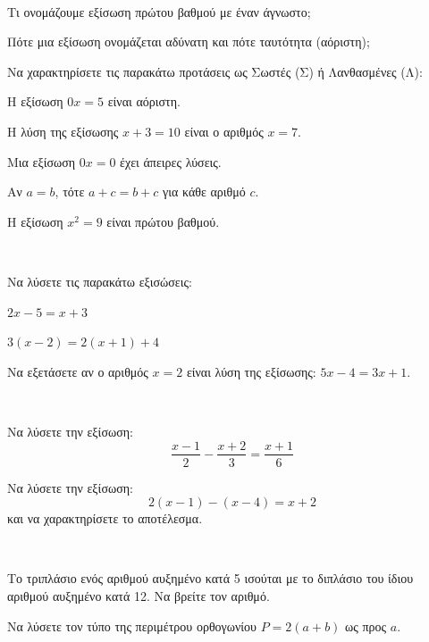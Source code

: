 \documentclass[11pt,a4paper,modern,F]{FFExam}
\begin{document}

\begin{thema}
\item\mbox{}\\
\begin{erwthma}
    \item Τι ονομάζουμε εξίσωση πρώτου βαθμού με έναν άγνωστο; 
    \item Πότε μια εξίσωση ονομάζεται αδύνατη και πότε ταυτότητα (αόριστη); 
    \item Να χαρακτηρίσετε τις παρακάτω προτάσεις ως Σωστές (Σ) ή Λανθασμένες (Λ):
    \begin{alist}
        \item Η εξίσωση $0x = 5$ είναι αόριστη.
        \item Η λύση της εξίσωσης $x + 3 = 10$ είναι ο αριθμός $x = 7$.
        \item Μια εξίσωση $0x = 0$ έχει άπειρες λύσεις.
        \item Αν $a = b$, τότε $a + c = b + c$ για κάθε αριθμό $c$.
        \item Η εξίσωση $x^2 = 9$ είναι πρώτου βαθμού.
    \end{alist} 
\end{erwthma}

\item\mbox{}\\
\begin{erwthma}
    \item Να λύσετε τις παρακάτω εξισώσεις:
    \begin{alist}
        \item $2x - 5 = x + 3$
        \item $3(x - 2) = 2(x + 1) + 4$
    \end{alist} 
    \item Να εξετάσετε αν ο αριθμός $x = 2$ είναι λύση της εξίσωσης: $5x - 4 = 3x + 1$. 
\end{erwthma}

\item\mbox{}\\
\begin{erwthma}
    \item Να λύσετε την εξίσωση:
    \[ \frac{x - 1}{2} - \frac{x + 2}{3} = \frac{x + 1}{6} \] 
    \item Να λύσετε την εξίσωση:
    \[ 2(x - 1) - (x - 4) = x + 2 \] και να χαρακτηρίσετε το αποτέλεσμα. 
\end{erwthma}

\item\mbox{}\\
\begin{erwthma}
    \item Το τριπλάσιο ενός αριθμού αυξημένο κατά 5 ισούται με το διπλάσιο του ίδιου αριθμού αυξημένο κατά 12. Να βρείτε τον αριθμό. 
    \item Να λύσετε τον τύπο της περιμέτρου ορθογωνίου $P = 2(a + b)$ ως προς $a$. 
\end{erwthma}
\end{thema}

\kaliepityxia
\end{document}
